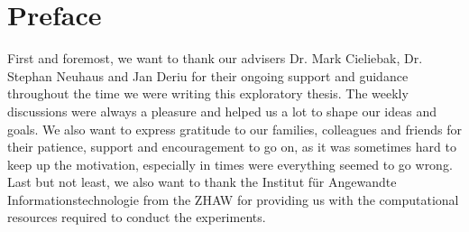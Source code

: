 \chapter*{Preface}
First and foremost, we want to thank our advisers Dr. Mark Cieliebak, Dr. Stephan Neuhaus and Jan Deriu for their ongoing support and guidance throughout the time we were writing this exploratory thesis. The weekly discussions were always a pleasure and helped us a lot to shape our ideas and goals. We also want to express gratitude to our families, colleagues and friends for their patience, support and encouragement to go on, as it was sometimes hard to keep up the motivation, especially in times were everything seemed to go wrong. Last but not least, we also want to thank the Institut für Angewandte Informationstechnologie from the ZHAW for providing us with the computational resources required to conduct the experiments.
